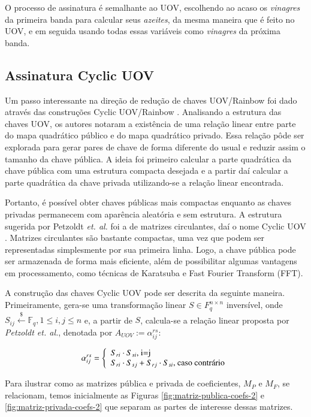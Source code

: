 \documentclass{SBCbookchapter}
\newcommand{\F}{\mathbb{F}}
\newcommand{\Samples}{\stackrel{\$}{\gets}}
\begin{document}
\begin{otherlanguage}{brazilian}
O processo de assinatura é semalhante ao UOV, escolhendo ao acaso os \emph{vinagres} da primeira banda para calcular seus \emph{azeites}, da mesma maneira que é feito no UOV, e em seguida usando todas essas variáveis como \emph{vinagres} da próxima banda.

\subsection{Assinatura Cyclic UOV}
Um passo interessante na direção de redução de chaves UOV/Rainbow foi dado através das construções Cyclic UOV/Rainbow \cite{petzoldt-bulygin-buchmann:cyclicouv,petzoldt-bulygin-buchmann:cyclicrainbow}. Analisando a estrutura das chaves UOV, os autores notaram a existência de uma relação linear entre parte do mapa quadrático público e do mapa quadrático privado. Essa relação pôde ser explorada para gerar pares de chave de forma diferente do usual e reduzir assim o tamanho da chave pública. A ideia foi primeiro calcular a parte quadrática da chave pública com uma estrutura compacta desejada e a partir daí calcular a parte quadrática da chave privada utilizando-se a relação linear encontrada. 

Portanto, é possível obter chaves públicas mais compactas enquanto as chaves privadas permanecem com aparência aleatória e sem estrutura. A estrutura sugerida por Petzoldt \emph{et. al.} foi a de matrizes circulantes, daí o nome Cyclic UOV \cite{petzoldt-bulygin-buchmann:cyclicouv}. Matrizes circulantes são bastante compactas, uma vez que podem ser representadas simplesmente por sua primeira linha. Logo, a chave pública pode ser armazenada de forma mais eficiente, além de possibilitar algumas vantagens em processamento, como técnicas de Karatsuba e Fast Fourier Transform (FFT).

A construção das chaves Cyclic UOV pode ser descrita da seguinte maneira. Primeiramente, gera-se uma transformação linear $S \in F^{n \times n}_q$ inversível, onde $S_{ij} \Samples \F_q, 1 \leq i,j \leq n$ e, a partir de $S$,  calcula-se a relação linear proposta por \emph{Petzoldt et. al.}, denotada por $A_{UOV} := \alpha^{rs}_{ij}$:

\[ \alpha^{rs}_{ij} = \left\{ 
   \begin{array}{l l}
    S_{ri} \cdot S_{si} \textrm{, i=j}\\
    S_{ri} \cdot S_{sj} + S_{rj} \cdot S_{si} \textrm{, caso contrário}
   \end{array} \right.\]

Para ilustrar como as matrizes pública e privada de coeficientes, $M_{P}$ e $M_{F}$, se relacionam, temos inicialmente as Figuras \ref{fig:matriz-publica-coefs-2} e \ref{fig:matriz-privada-coefs-2} que separam as partes de interesse dessas matrizes.


\end{otherlanguage}
\end{document}
